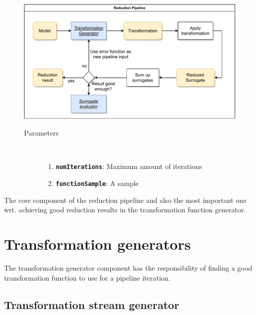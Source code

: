 \documentclass[
  a4paper,  %
  twoside,  %
  bibliography=totoc,
  headsepline,
  cleardoublepage=empty,
  parskip=half,
  draft=false
]{scrbook}
\begin{document}
\begin{figure}[H]

\includegraphics[width=\textwidth]{graphics/ReductionPipeline.pdf}
\vspace{-1.5mm}

\begin{mdframed}[linewidth=0.7px]

\begin{description}
\item[Parameters] {~ \begin{enumerate}[\indent{}]
\item \texttt{\textbf{numIterations}}: Maximum amount of iterations
\item \texttt{\textbf{functionSample}}: A sample
\end{enumerate}}
\end{description}

\end{mdframed}
\label{fig:astsg}
\end{figure}

The core component of the reduction pipeline and also the most important one wrt. achieving good reduction results in the transformation function generator.

\newpage
\section {Transformation generators}
\label{sec:tg}

The transformation generator component has the responsibility of finding a good transformation function to use for a pipeline iteration.

\subsection {Transformation stream generator}
\end{document}
